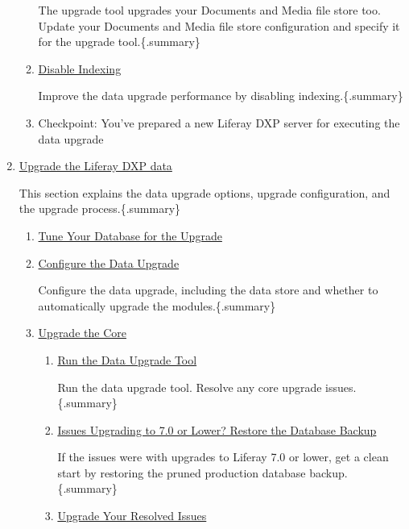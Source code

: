\begin{enumerate}
\begin{enumerate}
    The upgrade tool upgrades your Documents and Media file store too.
    Update your Documents and Media file store configuration and specify
    it for the upgrade tool.\{.summary\}
  \item
    \href{/docs/7-2/deploy/-/knowledge_base/d/preparing-a-new-product-server-for-data-upgrade\#disable-indexing}{Disable
    Indexing}

    Improve the data upgrade performance by disabling
    indexing.\{.summary\}
  \item
    Checkpoint: You've prepared a new Liferay DXP server for executing
    the data upgrade
  \end{enumerate}
\item
  \href{/docs/7-2/deploy/-/knowledge_base/d/upgrading-the-product-data}{Upgrade
  the Liferay DXP data}

  This section explains the data upgrade options, upgrade configuration,
  and the upgrade process.\{.summary\}

  \begin{enumerate}
  \def\labelenumii{\arabic{enumii}.}
  \item
    \href{/docs/7-2/deploy/-/knowledge_base/d/tuning-for-the-data-upgrade}{Tune
    Your Database for the Upgrade}
  \item
    \href{/docs/7-2/deploy/-/knowledge_base/d/configuring-the-data-upgrade}{Configure
    the Data Upgrade}

    Configure the data upgrade, including the data store and whether to
    automatically upgrade the modules.\{.summary\}
  \item
    \href{/docs/7-2/deploy/-/knowledge_base/d/upgrading-the-core-using-the-upgrade-tool}{Upgrade
    the Core}

    \begin{enumerate}
    \def\labelenumiii{\arabic{enumiii}.}
    \item
      \href{/docs/7-2/deploy/-/knowledge_base/d/upgrading-the-core-using-the-upgrade-tool\#upgrade-tool-usage}{Run
      the Data Upgrade Tool}

      Run the data upgrade tool. Resolve any core upgrade
      issues.\{.summary\}
    \item
      \href{/docs/7-2/deploy/-/knowledge_base/d/preparing-to-upgrade-the-product-database\#synchronize-a-complete-backup}{Issues
      Upgrading to 7.0 or Lower? Restore the Database Backup}

      If the issues were with upgrades to Liferay 7.0 or lower, get a
      clean start by restoring the pruned production database
      backup.\{.summary\}
    \item
      \href{/docs/7-2/deploy/-/knowledge_base/d/upgrading-the-core-using-the-upgrade-tool}{Upgrade
      Your Resolved Issues}


\end{enumerate}
\end{enumerate}
\end{enumerate}
